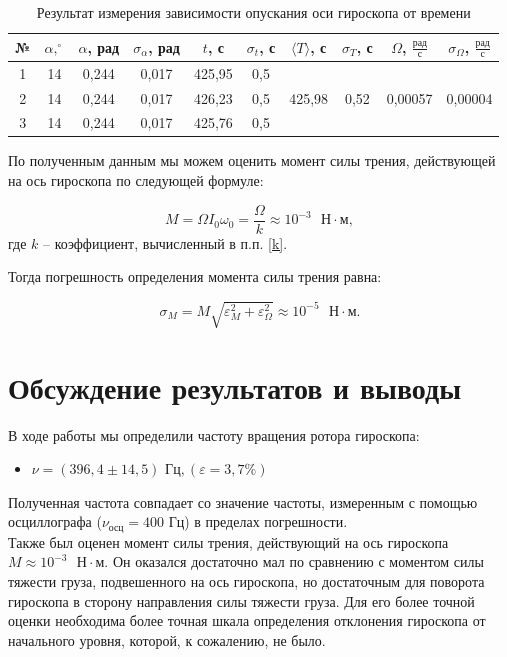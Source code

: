 \documentclass[a4paper,12pt]{article} %
\begin{document}
\begin{table}[H]
	\centering
	\begin{tabular}{|c|c|c|c|c|c|c|c|c|c|}
		\hline
		№ & $ \alpha, ^\circ $ & $ \alpha $, рад & $ \sigma_\alpha $, рад & $ t $, с & $ \sigma_t $, с & $ \langle T \rangle $, с & $ \sigma_T $, с & $ \Omega $, $ \frac{\text{рад}}{\text{с}} $ & $ \sigma_\Omega $,  $ \frac{\text{рад}}{\text{с}}  $ \\ \hline
		1 & 14 & 0,244 & 0,017 & 425,95 & 0,5 & \multirow{3}{*}{425,98} & \multirow{3}{*}{0,52} & \multirow{3}{*}{0,00057} & \multirow{3}{*}{0,00004} \\ \cline{1-6}
		2 & 14 & 0,244 & 0,017 & 426,23 & 0,5 &  &  &  &  \\ \cline{1-6}
		3 & 14 & 0,244 & 0,017 & 425,76 & 0,5 &  &  &  &  \\ \hline
	\end{tabular}
	\caption{Результат измерения зависимости опускания оси гироскопа от времени}
	\label{tab:my-table}
\end{table}

По полученным данным мы можем оценить момент силы трения, действующей на ось гироскопа по следующей формуле:

\begin{equation}
M = \Omega I_0\omega_0 = \frac{\Omega}{k} \approx 10^{-3} \text{ } \text{Н} \cdot \text{м},
\end{equation}
где $ k $ -- коэффициент, вычисленный в п.п. \ref{k}.

Тогда погрешность определения момента силы трения равна:

\begin{equation}
\sigma_M = M\sqrt{\varepsilon_M^2+\varepsilon_\Omega^2} \approx 10^{-5} \text{ } \text{Н} \cdot \text{м}.
\end{equation}

\section{Обсуждение результатов и выводы}

В ходе работы мы определили частоту вращения ротора гироскопа:

\begin{itemize}
	\item \underline{$ \nu = \left( 396,4 \pm 14,5 \right) \text{ Гц}, \left( \varepsilon = 3,7 \% \right)   $}
\end{itemize}
Полученная частота совпадает со значение частоты, измеренным с помощью осциллографа ($ \nu_\text{осц} = 400 $ Гц) в пределах погрешности.\\
Также был оценен момент силы трения, действующий на ось гироскопа $ M \approx 10^{-3} \text{ } \text{Н} \cdot \text{м} $. Он оказался достаточно мал по сравнению с моментом силы тяжести груза, подвешенного на ось гироскопа, но достаточным для поворота гироскопа в сторону направления силы тяжести груза. Для его более точной оценки необходима более точная шкала определения отклонения гироскопа от начального уровня, которой, к сожалению, не было.
\end{document}
